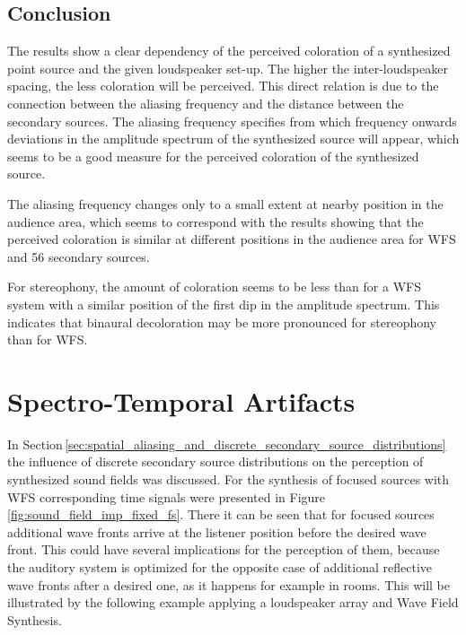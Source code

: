 \subsection{Conclusion}
\label{sec:coloration_conclusion}
%
The results show a clear dependency of the perceived coloration of a synthesized
point source and the given loudspeaker set-up. The higher the inter-loudspeaker
spacing, the less coloration will be perceived. This direct relation is due to
the connection between the
aliasing frequency and the distance between the secondary sources. The aliasing
frequency specifies from which frequency onwards deviations in the amplitude spectrum
of the synthesized source will appear, which seems to be a good measure for the
perceived coloration of the synthesized source.

The aliasing frequency changes only to a small extent at nearby position in the
audience area, which seems to correspond with the results showing that the perceived
coloration is similar at different positions in the audience area for \ac{WFS}
and 56 secondary sources.

For stereophony, the amount of coloration seems to be less than for a \ac{WFS}
system with a similar position of the first dip in the amplitude spectrum. This
indicates that binaural decoloration may be more pronounced for stereophony than
for \ac{WFS}.


\section{Spectro-Temporal Artifacts}
\label{sec:spectro_temporal_artifacts}

In Section\,\ref{sec:spatial_aliasing_and_discrete_secondary_source_distributions}
the influence of discrete secondary source distributions on the perception of
synthesized sound fields was discussed. For the synthesis of focused sources
with \ac{WFS} corresponding time signals were presented in
Figure\,\ref{fig:sound_field_imp_fixed_fs}. There it can be seen that for focused
sources additional wave fronts arrive at the listener position before the
desired wave front. This could have several implications for the perception of
them, because the auditory system is optimized for the opposite case of
additional reflective wave fronts after a desired one, as it happens for example
in rooms.
This will be illustrated by the following example applying
a loudspeaker array and Wave Field Synthesis.

